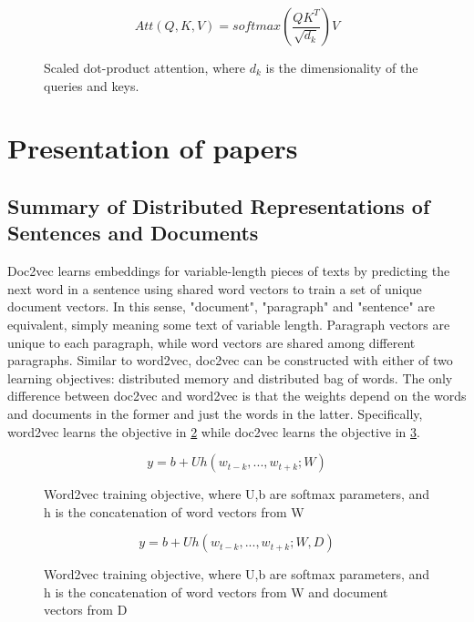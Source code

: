 \begin{figure}
    \centering
    $$Att(Q,K,V) = softmax(\frac{QK^T}{\sqrt{d_k}})V$$
    \caption{Scaled dot-product attention, where $d_k$ is the dimensionality of the queries and keys.}
    \label{fig:attention-formula}
\end{figure}

\section{\label{sec:level4} Presentation of papers}
\subsection{Summary of Distributed Representations of Sentences and Documents}
Doc2vec \cite{conf/icml/LeM14} learns embeddings for variable-length pieces of texts by predicting the next word in a sentence using shared word vectors to train a set of unique document vectors.  In this sense, "document", "paragraph" and "sentence" are equivalent, simply meaning some text of variable length. Paragraph vectors are unique to each paragraph, while word vectors are shared among different paragraphs. Similar to word2vec, doc2vec can be constructed with either of two learning objectives: distributed memory and distributed bag of words. The only difference between doc2vec and word2vec is that the weights depend on the words and documents in the former and just the words in the latter. Specifically, word2vec learns the objective in \ref{fig:word2vec-obj} while doc2vec learns the objective in \ref{fig:doc2vec-obj}.

\begin{figure}
    \centering
    $$y=b+Uh(w_{t-k}, ..., w_{t+k};W)$$
    \caption{Word2vec training objective, where U,b are softmax parameters, and h is the concatenation of word vectors from W}
    \label{fig:word2vec-obj}
\end{figure}

\begin{figure}
    \centering
    $$y=b+Uh(w_{t-k}, ..., w_{t+k};W,D)$$
    \caption{Word2vec training objective, where U,b are softmax parameters, and h is the concatenation of word vectors from W and document vectors from D}
    \label{fig:doc2vec-obj}
\end{figure}

